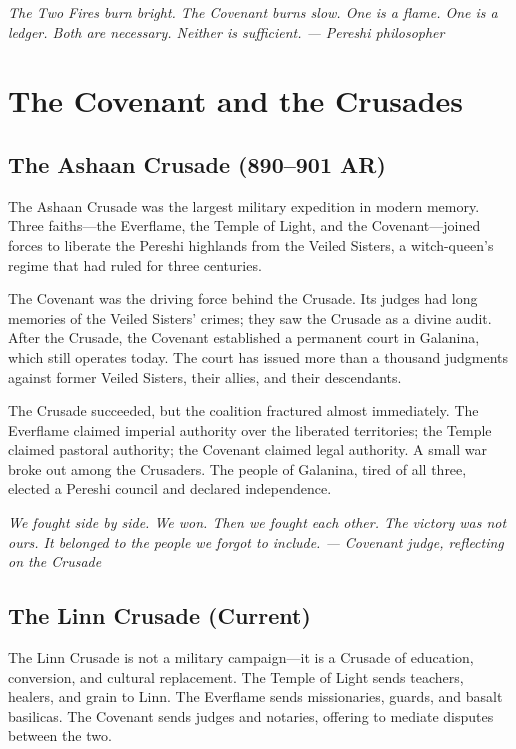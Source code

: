 \documentclass{book}
\newcommand{\citation}[1]{\textcolor{marginalia}{\small\textit{#1}}}
\begin{document}
\citation{The Two Fires burn bright. The Covenant burns slow. One is a flame. One is a ledger. Both are necessary. Neither is sufficient. --- Pereshi philosopher}

\chapter{The Covenant and the Crusades}

\section{The Ashaan Crusade (890--901 AR)}

The Ashaan Crusade was the largest military expedition in modern memory. Three faiths---the Everflame, the Temple of Light, and the Covenant---joined forces to liberate the Pereshi highlands from the Veiled Sisters, a witch-queen's regime that had ruled for three centuries.

The Covenant was the driving force behind the Crusade. Its judges had long memories of the Veiled Sisters' crimes; they saw the Crusade as a divine audit. After the Crusade, the Covenant established a permanent court in Galanina, which still operates today. The court has issued more than a thousand judgments against former Veiled Sisters, their allies, and their descendants.

The Crusade succeeded, but the coalition fractured almost immediately. The Everflame claimed imperial authority over the liberated territories; the Temple claimed pastoral authority; the Covenant claimed legal authority. A small war broke out among the Crusaders. The people of Galanina, tired of all three, elected a Pereshi council and declared independence.

\citation{We fought side by side. We won. Then we fought each other. The victory was not ours. It belonged to the people we forgot to include. --- Covenant judge, reflecting on the Crusade}

\section{The Linn Crusade (Current)}

The Linn Crusade is not a military campaign---it is a Crusade of education, conversion, and cultural replacement. The Temple of Light sends teachers, healers, and grain to Linn. The Everflame sends missionaries, guards, and basalt basilicas. The Covenant sends judges and notaries, offering to mediate disputes between the two.
\end{document}
